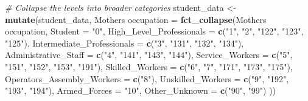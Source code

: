 \documentclass[
]{article}
\newenvironment{Shaded}{\begin{snugshade}}{\end{snugshade}}
\newcommand{\AttributeTok}[1]{\textcolor[rgb]{0.13,0.29,0.53}{#1}}
\newcommand{\CommentTok}[1]{\textcolor[rgb]{0.56,0.35,0.01}{\textit{#1}}}
\newcommand{\FunctionTok}[1]{\textcolor[rgb]{0.13,0.29,0.53}{\textbf{#1}}}
\newcommand{\NormalTok}[1]{#1}
\newcommand{\OtherTok}[1]{\textcolor[rgb]{0.56,0.35,0.01}{#1}}
\newcommand{\StringTok}[1]{\textcolor[rgb]{0.31,0.60,0.02}{#1}}
\begin{document}
\begin{Shaded}
\begin{Highlighting}[]
\CommentTok{\# Collapse the levels into broader categories}
\NormalTok{student\_data }\OtherTok{\textless{}{-}} \FunctionTok{mutate}\NormalTok{(student\_data, }\StringTok{\textasciigrave{}}\AttributeTok{Mother\textquotesingle{}s occupation}\StringTok{\textasciigrave{}} \OtherTok{=} \FunctionTok{fct\_collapse}\NormalTok{(}\StringTok{\textasciigrave{}}\AttributeTok{Mother\textquotesingle{}s occupation}\StringTok{\textasciigrave{}}\NormalTok{,}
    \AttributeTok{Student =} \StringTok{"0"}\NormalTok{,}
    \AttributeTok{High\_Level\_Professionals =} \FunctionTok{c}\NormalTok{(}\StringTok{"1"}\NormalTok{, }\StringTok{"2"}\NormalTok{, }\StringTok{"122"}\NormalTok{, }\StringTok{"123"}\NormalTok{, }\StringTok{"125"}\NormalTok{),}
    \AttributeTok{Intermediate\_Professionals =} \FunctionTok{c}\NormalTok{(}\StringTok{"3"}\NormalTok{, }\StringTok{"131"}\NormalTok{, }\StringTok{"132"}\NormalTok{, }\StringTok{"134"}\NormalTok{),}
    \AttributeTok{Administrative\_Staff =} \FunctionTok{c}\NormalTok{(}\StringTok{"4"}\NormalTok{, }\StringTok{"141"}\NormalTok{, }\StringTok{"143"}\NormalTok{, }\StringTok{"144"}\NormalTok{),}
    \AttributeTok{Service\_Workers =} \FunctionTok{c}\NormalTok{(}\StringTok{"5"}\NormalTok{, }\StringTok{"151"}\NormalTok{, }\StringTok{"152"}\NormalTok{, }\StringTok{"153"}\NormalTok{, }\StringTok{"191"}\NormalTok{),}
    \AttributeTok{Skilled\_Workers =} \FunctionTok{c}\NormalTok{(}\StringTok{"6"}\NormalTok{, }\StringTok{"7"}\NormalTok{, }\StringTok{"171"}\NormalTok{, }\StringTok{"173"}\NormalTok{, }\StringTok{"175"}\NormalTok{),}
    \AttributeTok{Operators\_Assembly\_Workers =} \FunctionTok{c}\NormalTok{(}\StringTok{"8"}\NormalTok{),}
    \AttributeTok{Unskilled\_Workers =} \FunctionTok{c}\NormalTok{(}\StringTok{"9"}\NormalTok{, }\StringTok{"192"}\NormalTok{, }\StringTok{"193"}\NormalTok{, }\StringTok{"194"}\NormalTok{),}
    \AttributeTok{Armed\_Forces =} \StringTok{"10"}\NormalTok{,}
    \AttributeTok{Other\_Unknown =} \FunctionTok{c}\NormalTok{(}\StringTok{"90"}\NormalTok{, }\StringTok{"99"}\NormalTok{)}
\NormalTok{))}
\end{Highlighting}
\end{Shaded}
\end{document}
